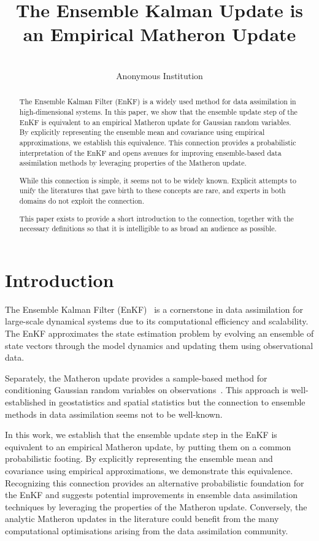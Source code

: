 \documentclass[wcp]{jmlr} %
\title[Ensemble Kalman Update]{The Ensemble Kalman Update is an Empirical Matheron Update}
\author{\Name{Anonymous Authors}\\
  \addr Anonymous Institution}
\begin{document}
\maketitle

\begin{abstract}
The Ensemble Kalman Filter (EnKF) is a widely used method for data assimilation in high-dimensional systems. In this paper, we show that the ensemble update step of the EnKF is equivalent to an empirical Matheron update for Gaussian random variables. By explicitly representing the ensemble mean and covariance using empirical approximations, we establish this equivalence. This connection provides a probabilistic interpretation of the EnKF and opens avenues for improving ensemble-based data assimilation methods by leveraging properties of the Matheron update.

While this connection is simple, it seems not to be widely known. Explicit attempts to unify the literatures that gave birth to these concepts are rare, and experts in both domains do not exploit the connection.

This paper exists to provide a short introduction to the connection, together with the necessary definitions so that it is intelligible to as broad an audience as possible.
\end{abstract}

\section{Introduction}
The Ensemble Kalman Filter (EnKF)~\citep{Evensen2003Ensemble,Evensen2009Data} is a cornerstone in data assimilation for large-scale dynamical systems due to its computational efficiency and scalability.
The EnKF approximates the state estimation problem by evolving an ensemble of state vectors through the model dynamics and updating them using observational data.

Separately, the Matheron update provides a sample-based method for conditioning Gaussian random variables on observations~\citep{Doucet2010Note,Wilson2020Efficiently,Wilson2021Pathwise}.
This approach is well-established in geostatistics and spatial statistics but the connection to ensemble methods in data assimilation seems not to be well-known.

In this work, we establish that the ensemble update step in the EnKF is equivalent to an empirical Matheron update, by putting them on a common probabilistic footing.
By explicitly representing the ensemble mean and covariance using empirical approximations, we demonstrate this equivalence.
Recognizing this connection provides an alternative  probabilistic foundation for the EnKF and suggests potential improvements in ensemble data assimilation techniques by leveraging the properties of the Matheron update.
Conversely, the analytic Matheron updates in the literature could benefit from the many computational optimisations arising from the data assimilation community.
\end{document}
